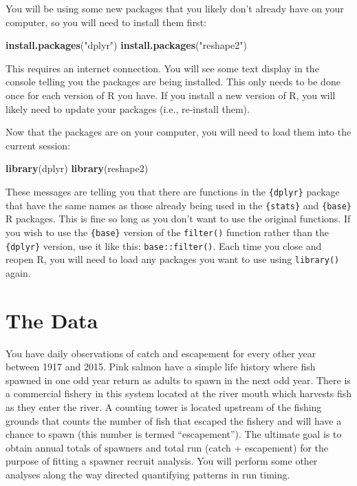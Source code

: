 \documentclass[]{book}
\newenvironment{Shaded}{\begin{snugshade}}{\end{snugshade}}
\newcommand{\KeywordTok}[1]{\textcolor[rgb]{0.13,0.29,0.53}{\textbf{#1}}}
\newcommand{\StringTok}[1]{\textcolor[rgb]{0.31,0.60,0.02}{#1}}
\newcommand{\NormalTok}[1]{#1}
\theoremstyle{definition}
\theoremstyle{definition}
\theoremstyle{definition}
\theoremstyle{remark}
\begin{document}
You will be using some new packages that you likely don't already have
on your computer, so you will need to install them first:

\begin{Shaded}
\begin{Highlighting}[]
\KeywordTok{install.packages}\NormalTok{(}\StringTok{"dplyr"}\NormalTok{)}
\KeywordTok{install.packages}\NormalTok{(}\StringTok{"reshape2"}\NormalTok{)}
\end{Highlighting}
\end{Shaded}

This requires an internet connection. You will see some text display in
the console telling you the packages are being installed. This only
needs to be done once for each version of R you have. If you install a
new version of R, you will likely need to update your packages (i.e.,
re-install them).

Now that the packages are on your computer, you will need to load them
into the current session:

\begin{Shaded}
\begin{Highlighting}[]
\KeywordTok{library}\NormalTok{(dplyr)}
\KeywordTok{library}\NormalTok{(reshape2)}
\end{Highlighting}
\end{Shaded}

These messages are telling you that there are functions in the
\texttt{\{dplyr\}} package that have the same names as those already
being used in the \texttt{\{stats\}} and \texttt{\{base\}} R packages.
This is fine so long as you don't want to use the original functions. If
you wish to use the \texttt{\{base\}} version of the \texttt{filter()}
function rather than the \texttt{\{dplyr\}} version, use it like this:
\texttt{base::filter()}. Each time you close and reopen R, you will need
to load any packages you want to use using \texttt{library()} again.

\section{The Data}\label{the-data}

You have daily observations of catch and escapement for every other year
between 1917 and 2015. Pink salmon have a simple life history where fish
spawned in one odd year return as adults to spawn in the next odd year.
There is a commercial fishery in this system located at the river mouth
which harvests fish as they enter the river. A counting tower is located
upstream of the fishing grounds that counts the number of fish that
escaped the fishery and will have a chance to spawn (this number is
termed ``escapement''). The ultimate goal is to obtain annual totals of
spawners and total run (catch + escapement) for the purpose of fitting a
spawner recruit analysis. You will perform some other analyses along the
way directed quantifying patterns in run timing.
\end{document}
